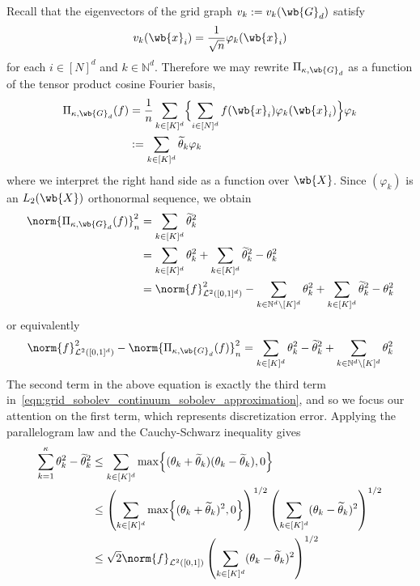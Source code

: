 \documentclass{article}
\newcommand{\1}{\mathbf{1}}
\newcommand{\Nbb}{\mathbb{N}}
\newcommand{\Leb}{\mathcal{L}}
\newcommand{\wt}[1]{\widetilde{#1}}
\theoremstyle{alden}
\theoremstyle{aldenthm}
\theoremstyle{definition}
\theoremstyle{remark}
\begin{document}
Recall that the eigenvectors of the grid graph $v_k := v_k(\wb{G}_d)$ satisfy
\begin{equation*}
v_{k}(\wb{x}_i) = \frac{1}{\sqrt{n}} \varphi_{k}(\wb{x}_i)
\end{equation*}
for each $i \in [N]^d$ and $k \in \mathbb{N}^d$. Therefore we may rewrite $\Pi_{\kappa,\wb{G}_d}$ as a function of the tensor product cosine Fourier basis,
\begin{align*}
\Pi_{\kappa,\wb{G}_d}(f) & = \frac{1}{n} \sum_{k \in [K]^d} \Bigl\{\sum_{i \in [N]^d} f(\wb{x}_i) \varphi_k(\wb{x}_i)\Bigr\} \varphi_k \\
& :=  \sum_{k \in [K]^d} \wt{\theta}_k \varphi_k
\end{align*}
where we interpret the right hand side as a function over $\wb{X}$. Since $(\varphi_k)$ is an $L_2(\wb{X})$ orthonormal sequence, we obtain
\begin{align*}
\norm{\Pi_{\kappa,\wb{G}_d}(f)}_n^2 & = \sum_{k \in [K]^d} \wt{\theta}_k^2 \\ 
& = \sum_{k \in [K]^d} {\theta}_k^2 + \sum_{k \in [K]^d} \wt{\theta}_k^2 - \theta_k^2 \\
& = \norm{f}_{\Leb^2([0,1]^d)}^2 - \sum_{k \in \Nbb^d \setminus [K]^d} \theta_k^2 + \sum_{k \in [K]^d} \wt{\theta}_k^2 - \theta_k^2
\end{align*}
or equivalently
\begin{equation*}
\norm{f}_{\Leb^2([0,1]^d)}^2 - \norm{\Pi_{\kappa,\wb{G}_d}(f)}_n^2 = \sum_{k \in [K]^d} \theta_k^2 - \wt{\theta}_k^2 + \sum_{k \in \Nbb^d \setminus [K]^d} \theta_k^2
\end{equation*}
The second term in the above equation is exactly the third term in~\eqref{eqn:grid_sobolev_continuum_sobolev_approximation}, and so we focus our attention on the first term, which represents discretization error. Applying the parallelogram law and the Cauchy-Schwarz inequality gives
\begin{equation}
\label{eqn:grid_sobolev_approximation_error6_pf1}
\begin{aligned}
\sum_{k = 1}^{\kappa} \theta_k^2 - \wt{\theta}_k^2 & \leq \sum_{k \in [K]^d} \max\Bigl\{(\theta_k + \wt{\theta}_k)(\theta_k - \wt{\theta}_k),0\Bigr\} \\
& \leq \left(\sum_{k \in [K]^d} \max\Bigl\{(\theta_k + \wt{\theta}_k)^2,0\Bigr\}\right)^{1/2} \left(\sum_{k \in [K]^d} (\theta_k - \wt{\theta}_k)^2\right)^{1/2} \\
& \leq \sqrt{2} \norm{f}_{\Leb^2([0,1])} \left(\sum_{k \in [K]^d} (\theta_k - \wt{\theta}_k)^2\right)^{1/2}
\end{aligned}
\end{equation}
\end{document}
